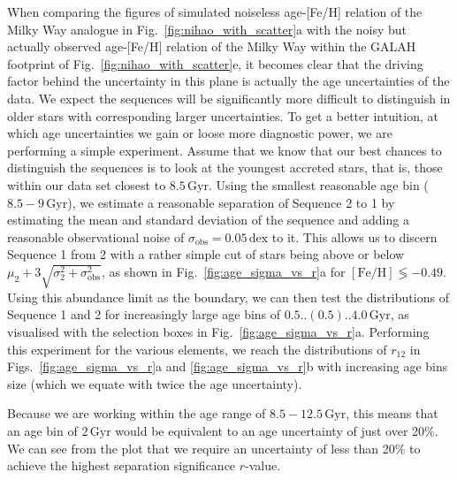 \documentclass[fleqn,usenatbib]{mnras}
\begin{document}
When comparing the figures of simulated noiseless age-[Fe/H] relation of the Milky Way analogue in Fig.~\ref{fig:nihao_with_scatter}a with the noisy but actually observed age-[Fe/H] relation of the Milky Way within the GALAH footprint of Fig.~\ref{fig:nihao_with_scatter}e, it becomes clear that the driving factor behind the uncertainty in this plane is actually the age uncertainties of the data. We expect the sequences will be significantly more difficult to distinguish in older stars with corresponding larger uncertainties. To get a better intuition, at which age uncertainties we gain or loose more diagnostic power, we are performing a simple experiment. Assume that we know that our best chances to distinguish the sequences is to look at the youngest accreted stars, that is, those within our data set closest to $8.5\,\mathrm{Gyr}$. Using the smallest reasonable age bin ($8.5-9\,\mathrm{Gyr}$), we estimate a reasonable separation of Sequence 2 to 1 by estimating the mean and standard deviation of the sequence and adding a reasonable observational noise of $\sigma_\mathrm{obs} = 0.05\,\mathrm{dex}$ to it. This allows us to discern Sequence 1 from 2 with a rather simple cut of stars being above or below $\mu_2 + 3 \sqrt{\sigma_2^2 + \sigma_\mathrm{obs}^2}$, as shown in Fig.~\ref{fig:age_sigma_vs_r}a for $\mathrm{[Fe/H]} \lessgtr -0.49$. Using this abundance limit as the boundary, we can then test the distributions of Sequence 1 and 2 for increasingly large age bins of $0.5..(0.5)..4.0\,\mathrm{Gyr}$, as visualised with the selection boxes in Fig.~\ref{fig:age_sigma_vs_r}a. Performing this experiment for the various elements, we reach the distributions of $r_{12}$ in Figs.~\ref{fig:age_sigma_vs_r}a and \ref{fig:age_sigma_vs_r}b with increasing age bins size (which we equate with twice the age uncertainty).

Because we are working within the age range of $8.5-12.5\,\mathrm{Gyr}$, this means that an age bin of $2\,\mathrm{Gyr}$ would be equivalent to an age uncertainty of just over 20\%. We can see from the plot that we require an uncertainty of less than 20\% to achieve the highest separation significance $r$-value.
\end{document}
